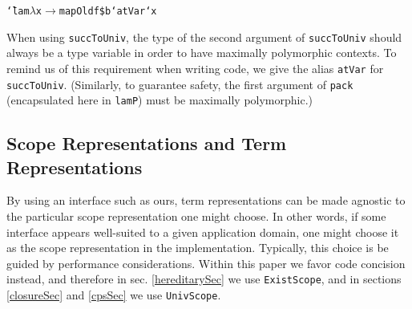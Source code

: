 \documentclass[9pt,authoryear]{sigplanconf}
\begin{document}
{{}\vphantom{$\{$}}\texttt{\mbox{\hspace{0.50em}}}\texttt{\mbox{\hspace{0.50em}}}\texttt{\mbox{\hspace{0.50em}}}\texttt{{\char `\=}}\texttt{\mbox{\hspace{0.50em}}}\texttt{lam}\texttt{\mbox{\hspace{0.50em}}}\texttt{\makebox[1.22ex][l]{$ {(} $}}\texttt{$ \lambda $}\texttt{\mbox{\hspace{0.50em}}}\texttt{x}\texttt{\mbox{\hspace{0.50em}}}\texttt{$ \rightarrow $}\texttt{\mbox{\hspace{0.50em}}}\texttt{mapOld}\texttt{\mbox{\hspace{0.50em}}}\texttt{f}\texttt{\mbox{\hspace{0.50em}}}\texttt{\makebox[1.22ex][c]{\textless{}}\${}\makebox[1.22ex][c]{\textgreater{}}}\texttt{\mbox{\hspace{0.50em}}}\texttt{\makebox[1.22ex][l]{$ {(} $}}\texttt{b}\texttt{\mbox{\hspace{0.50em}}}\texttt{{`}atVar{`}}\texttt{\mbox{\hspace{0.50em}}}\texttt{x}\texttt{\makebox[1.22ex][r]{$ {)} $}}\texttt{\makebox[1.22ex][r]{$ {)} $}}\texttt{{\nopagebreak \newline%
}\vphantom{$\{$}}%


%
%


%
When using \texttt{succToUniv}, the type of the second argument of
    \texttt{succToUniv} should always be a type variable in order to have
    maximally polymorphic contexts. To remind us of this requirement
    when writing code, we give the alias \texttt{atVar} for \texttt{succToUniv}.
    (Similarly, to guarantee safety, the first argument of \texttt{pack}    (encapsulated here in \texttt{lamP}) must be maximally polymorphic.)%


\subsection{Scope Representations and Term Representations}

%
By using an interface such as ours, term representations can be
    made agnostic to the particular scope representation one might
    choose. In other words, if some interface appears well-suited
    to a given application domain, one might choose it as the scope
    representation in the implementation. Typically, this choice is be
    guided by performance considerations. Within this paper we favor
    code concision instead, and therefore in sec. \ref{hereditarySec}    we use \texttt{ExistScope}, and in sections \ref{closureSec} and \ref{cpsSec} we use \texttt{UnivScope}.%
\end{document}
